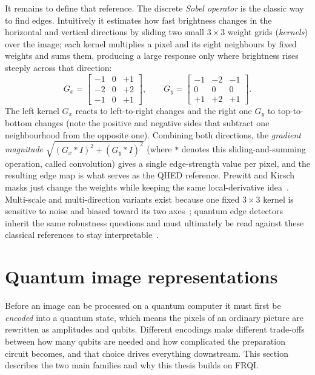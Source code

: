 It remains to define that reference. The discrete \emph{Sobel operator} is the classic way to find edges. Intuitively it estimates how fast brightness changes in the horizontal and vertical directions by sliding two small $3\times 3$ weight grids (\emph{kernels}) over the image; each kernel multiplies a pixel and its eight neighbours by fixed weights and sums them, producing a large response only where brightness rises steeply across that direction:
\begin{equation}
G_x = \begin{bmatrix}-1&0&+1\\-2&0&+2\\-1&0&+1\end{bmatrix},\qquad
G_y = \begin{bmatrix}-1&-2&-1\\0&0&0\\+1&+2&+1\end{bmatrix}.
\end{equation}
The left kernel $G_x$ reacts to left-to-right changes and the right one $G_y$ to top-to-bottom changes (note the positive and negative sides that subtract one neighbourhood from the opposite one). Combining both directions, the \emph{gradient magnitude} $\sqrt{(G_x*I)^2+(G_y*I)^2}$ (where $*$ denotes this sliding-and-summing operation, called convolution) gives a single edge-strength value per pixel, and the resulting edge map is what serves as the QHED reference. Prewitt and Kirsch masks just change the weights while keeping the same local-derivative idea~\cite{Zhou2019PrewittNEQR,Xu2020Kirsch}. Multi-scale and multi-direction variants exist because one fixed $3\times 3$ kernel is sensitive to noise and biased toward its two axes~\cite{Liu2022EightDirectionSobelNEQR}; quantum edge detectors inherit the same robustness questions and must ultimately be read against these classical references to stay interpretable~\cite{Fan2019SobelNEQR}.

\section{Quantum image representations}
Before an image can be processed on a quantum computer it must first be \emph{encoded} into a quantum state, which means the pixels of an ordinary picture are rewritten as amplitudes and qubits. Different encodings make different trade-offs between how many qubits are needed and how complicated the preparation circuit becomes, and that choice drives everything downstream. This section describes the two main families and why this thesis builds on FRQI.

